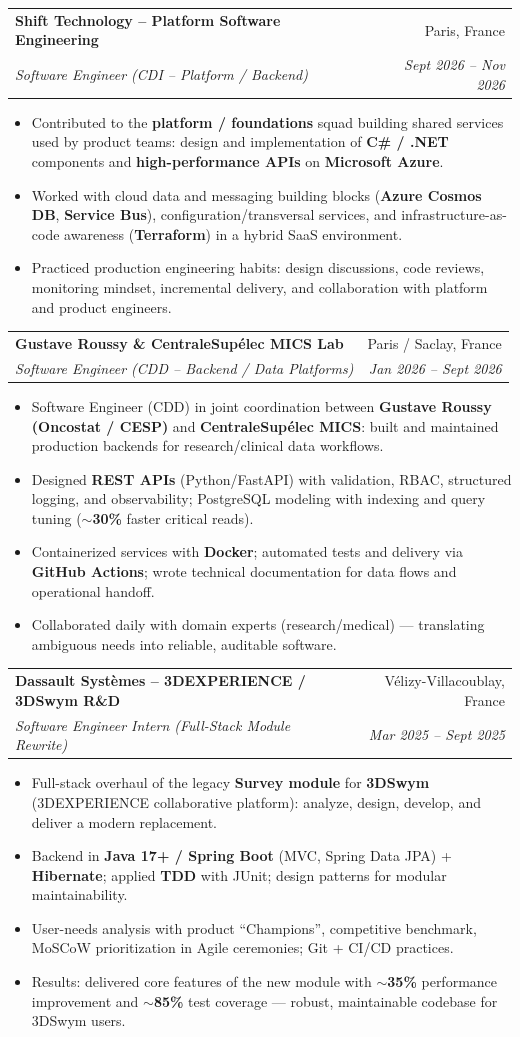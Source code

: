 \documentclass[letterpaper,10.5pt]{article}
\makeatletter
\newcommand{\resumeItem}[1]{\item\small{#1 \vspace{-1.5pt}}}
\newcommand{\resumeSubheading}[4]{
  \vspace{-1pt}\item
    \begin{tabular*}{0.97\textwidth}[t]{l@{\extracolsep{\fill}}r}
      \textbf{#1} & #2 \\
      \textit{\small#3} & \textit{\small #4} \\
    \end{tabular*}\vspace{-5pt}
}
\newcommand{\resumeItemListStart}{\begin{itemize}[leftmargin=0.18in]}
\newcommand{\resumeItemListEnd}{\end{itemize}\vspace{-3pt}}
\makeatother
\begin{document}
  \resumeSubheading
    {Shift Technology -- Platform Software Engineering}{Paris, France}
    {Software Engineer (CDI -- Platform / Backend)}{Sept 2026 -- Nov 2026}
    \resumeItemListStart
      \resumeItem{Contributed to the \textbf{platform / foundations} squad building shared services used by product teams: design and implementation of \textbf{C\# / .NET} components and \textbf{high-performance APIs} on \textbf{Microsoft Azure}.}
      \resumeItem{Worked with cloud data and messaging building blocks (\textbf{Azure Cosmos DB}, \textbf{Service Bus}), configuration/transversal services, and infrastructure-as-code awareness (\textbf{Terraform}) in a hybrid SaaS environment.}
      \resumeItem{Practiced production engineering habits: design discussions, code reviews, monitoring mindset, incremental delivery, and collaboration with platform and product engineers.}
    \resumeItemListEnd

  \resumeSubheading
    {Gustave Roussy \& CentraleSup\'elec MICS Lab}{Paris / Saclay, France}
    {Software Engineer (CDD -- Backend / Data Platforms)}{Jan 2026 -- Sept 2026}
    \resumeItemListStart
      \resumeItem{Software Engineer (CDD) in joint coordination between \textbf{Gustave Roussy (Oncostat / CESP)} and \textbf{CentraleSup\'elec MICS}: built and maintained production backends for research/clinical data workflows.}
      \resumeItem{Designed \textbf{REST APIs} (Python/FastAPI) with validation, RBAC, structured logging, and observability; PostgreSQL modeling with indexing and query tuning (\textbf{$\sim$30\%} faster critical reads).}
      \resumeItem{Containerized services with \textbf{Docker}; automated tests and delivery via \textbf{GitHub Actions}; wrote technical documentation for data flows and operational handoff.}
      \resumeItem{Collaborated daily with domain experts (research/medical) --- translating ambiguous needs into reliable, auditable software.}
    \resumeItemListEnd

  \resumeSubheading
    {Dassault Syst\`emes -- 3DEXPERIENCE / 3DSwym R\&D}{V\'elizy-Villacoublay, France}
    {Software Engineer Intern (Full-Stack Module Rewrite)}{Mar 2025 -- Sept 2025}
    \resumeItemListStart
      \resumeItem{Full-stack overhaul of the legacy \textbf{Survey module} for \textbf{3DSwym} (3DEXPERIENCE collaborative platform): analyze, design, develop, and deliver a modern replacement.}
      \resumeItem{Backend in \textbf{Java 17+ / Spring Boot} (MVC, Spring Data JPA) + \textbf{Hibernate}; applied \textbf{TDD} with JUnit; design patterns for modular maintainability.}
      \resumeItem{User-needs analysis with product ``Champions'', competitive benchmark, MoSCoW prioritization in Agile ceremonies; Git + CI/CD practices.}
      \resumeItem{Results: delivered core features of the new module with \textbf{$\sim$35\%} performance improvement and \textbf{$\sim$85\%} test coverage --- robust, maintainable codebase for 3DSwym users.}
    \resumeItemListEnd
\end{document}
